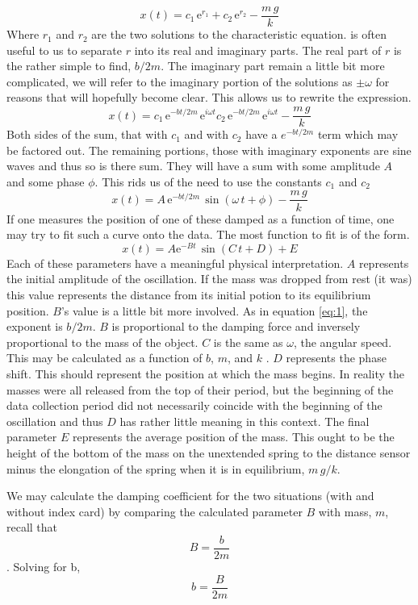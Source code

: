 \documentclass[11pt]{article}
\begin{document}
\[ x(t) = c_1 \, \mathrm{e}^{r_1} + c_2 \, \mathrm{e}^{r_2} - \frac{m \, g}{k}\]
Where \(r_1\) and \(r_2\) are the two solutions to the characteristic equation.  is often useful to us to separate \(r\) into its real and imaginary parts. The real part of \(r\) is the rather simple to find, \(b/2m\). The imaginary part remain a little bit more complicated, we will refer to the imaginary portion of the solutions as \(\pm \omega\) for reasons that will hopefully become clear. This allows us to rewrite the expression.
\[ x(t) = c_1 \, \mathrm{e}^{-bt/2m} \, \mathrm{e}^{ i \omega t} c_2 \, \mathrm{e}^{-bt/2m} \, \mathrm{e}^{ i \omega t} - \frac{m \, g}{k}\]
Both sides of the sum, that with \(c_1\) and with \(c_2\)  have a \(e^{-bt/2m}\) term which may be factored out. The remaining portions, those with imaginary exponents are sine waves and thus so is there sum. They will have a sum with some amplitude \(A\) and some phase \(\phi\). This rids us of the need to use the constants \(c_1\) and \(c_2\)
\[ x(t) =A \, \mathrm{e}^{-bt/2m}\, \sin(\omega \, t + \phi) - \frac{m \, g}{k} \label{eq:1} \]
If one measures the position of one of these damped as a function of time, one may try to fit such a curve onto the data. The most function to fit is of the form.
\[x(t) = A \mathrm{e}^{-B t} \, \sin(C \, t + D) + E\]
Each of these parameters have a meaningful physical interpretation. \(A\) represents the initial amplitude of the oscillation. If the mass was dropped from rest (it was) this value represents the distance from its initial potion to its equilibrium position. \(B\)’s value is a little bit more involved. As in equation \eqref{eq:1}, the exponent is \(b/2m\). \(B\) is proportional to the damping force and inversely proportional to the mass of the object. \(C\) is the same as \(\omega\), the angular speed. This may be calculated as a function of \(b\), \(m\), and \(k\) . \(D\) represents the phase shift. This should represent the position at which the mass begins. In reality the masses were all released from the top of their period, but the beginning of the data collection period did not necessarily coincide with the beginning of the oscillation and thus \(D\) has rather little meaning in this context. The final parameter \(E\) represents the average position of the mass. This ought to be the height of the bottom of the mass on the unextended spring to the distance sensor minus the elongation of the spring when it is in equilibrium, \(m \, g / k\).

We may calculate the damping coefficient for the two situations (with and without index card) by comparing the calculated parameter \(B\) with mass, \(m\), recall that
\[ B = \frac{b}{2m} \].
Solving for b,
\[ b = \frac{B}{2m}\]
\end{document}

